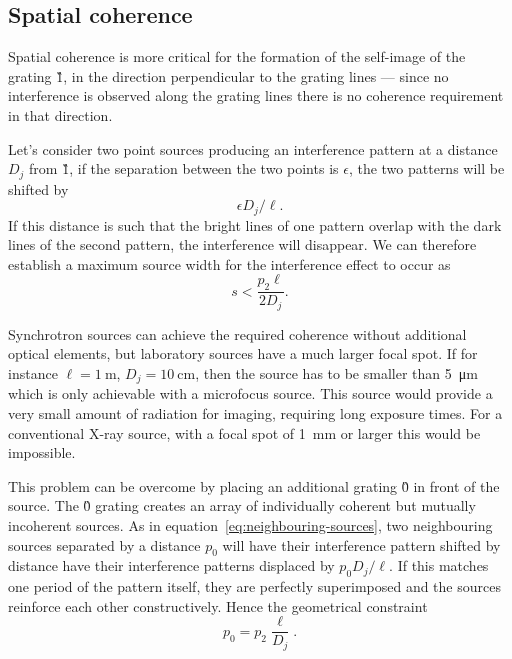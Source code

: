 \subsection{Spatial coherence}\label{sec:coherence}
Spatial coherence is more critical for the formation of the self-image of
the grating \G1, in the direction perpendicular to the grating lines --- since no
interference is observed along the grating lines there
is no coherence requirement in that direction.

Let's consider two point sources producing an interference pattern at a
distance $D_j$ from \G1, if the separation between the two points is
$\epsilon$, the two patterns will be shifted by 
\begin{equation}
    \epsilon D_j / \ell.
    \label{eq:neighbouring-sources}
\end{equation}
If this distance is such that the bright lines of one pattern
overlap with the dark lines of the second pattern, the interference will
disappear. We can therefore establish a maximum source width for the
interference effect to occur as
\begin{equation}
    s < \frac{p_2\ell}{2D_j}.
    \label{eq:source.size}
\end{equation}

Synchrotron sources can achieve the required coherence without additional
optical elements, but laboratory sources have a much larger focal spot. If
for instance $\ell = \SI{1}{\meter}$, $D_j = \SI{10}{\centi\meter}$, then
the source has to be smaller than \SI{5}{\micro\meter} which is only
achievable with a microfocus source. This source would provide a very small
amount of radiation for imaging, requiring long exposure times.
For a conventional X-ray source, with a focal spot of \SI{1}{\milli\meter}
or larger this would be impossible.

This problem can be overcome by placing an additional grating \G0 in front
of the source. The \G0 grating creates an array of individually coherent but
mutually incoherent sources. As in equation~\eqref{eq:neighbouring-sources},
two neighbouring sources separated by a distance $p_0$ will have their
interference pattern shifted by 
distance have their
interference patterns displaced by $p_0 D_j / \ell$. If this matches one
period of the pattern itself, they are perfectly superimposed and the
sources reinforce each other constructively. Hence the geometrical
constraint
\begin{equation}
    p_0 = p_2 \frac{\ell}{D_j}.\label{eq:p0}
\end{equation}

